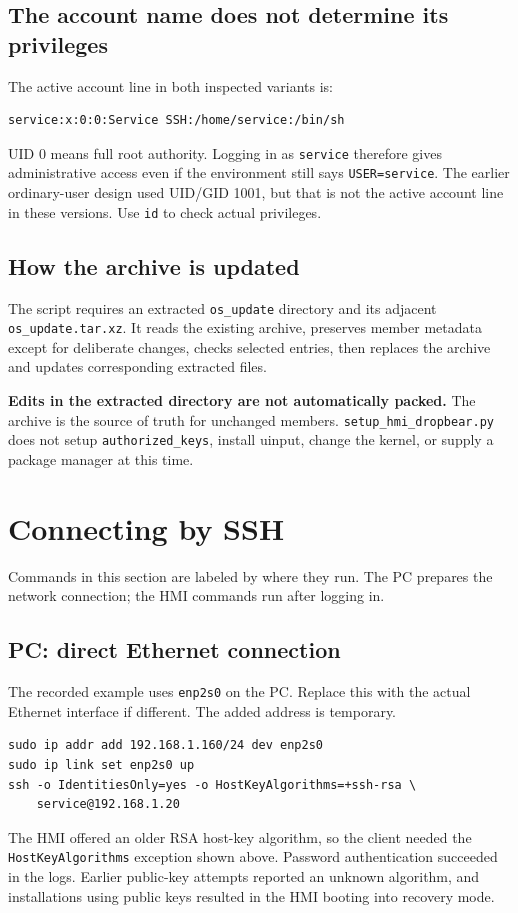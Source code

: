 \documentclass[10pt,letterpaper]{article}
\newcommand{\file}[1]{\nolinkurl{#1}}
\begin{document}
\subsection{The account name does not determine its privileges}
The active account line in both inspected variants is:
\begin{lstlisting}
service:x:0:0:Service SSH:/home/service:/bin/sh
\end{lstlisting}
UID 0 means full root authority. Logging in as \file{service} therefore gives
administrative access even if the environment still says \file{USER=service}.
The earlier ordinary-user design used UID/GID 1001, but that is not the active
account line in these versions. Use \file{id} to check actual privileges.


\subsection{How the archive is updated}
The script requires an extracted \file{os_update} directory and its adjacent
\file{os_update.tar.xz}. It reads the existing archive, preserves member metadata
except for deliberate changes, checks selected entries, then replaces the
archive and updates corresponding extracted files.

\textbf{Edits in the extracted directory are not automatically packed.}
The archive is the source of truth for unchanged members. \file{setup_hmi_dropbear.py} does not setup 
\file{authorized_keys}, install uinput, change the kernel, or supply a
package manager at this time. 

\newpage
\section{Connecting by SSH}\label{ssh}
Commands in this section are labeled by where they run. The PC prepares the
network connection; the HMI commands run after logging in.

\subsection{PC: direct Ethernet connection}
The recorded example uses \file{enp2s0} on the PC. Replace this with the actual
Ethernet interface if different. The added address is temporary.
\begin{lstlisting}
sudo ip addr add 192.168.1.160/24 dev enp2s0
sudo ip link set enp2s0 up
ssh -o IdentitiesOnly=yes -o HostKeyAlgorithms=+ssh-rsa \
    service@192.168.1.20
\end{lstlisting}
The HMI offered an older RSA host-key algorithm, so the client needed the
\file{HostKeyAlgorithms} exception shown above. Password authentication succeeded in
the logs. Earlier public-key attempts reported an unknown algorithm, and installations using
public keys resulted in the HMI booting into recovery mode. 
\end{document}
